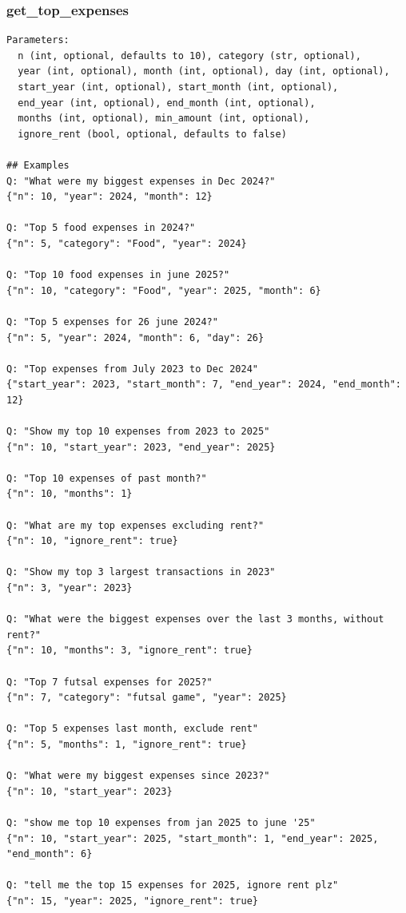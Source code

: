 \documentclass[11pt,twocolumn]{article}
\begin{document}
\subsubsection{get\_top\_expenses}
\begin{scriptsize}
\begin{verbatim}
Parameters:
  n (int, optional, defaults to 10), category (str, optional),
  year (int, optional), month (int, optional), day (int, optional),
  start_year (int, optional), start_month (int, optional),
  end_year (int, optional), end_month (int, optional),
  months (int, optional), min_amount (int, optional),
  ignore_rent (bool, optional, defaults to false)

## Examples
Q: "What were my biggest expenses in Dec 2024?"
{"n": 10, "year": 2024, "month": 12}

Q: "Top 5 food expenses in 2024?"
{"n": 5, "category": "Food", "year": 2024}

Q: "Top 10 food expenses in june 2025?"
{"n": 10, "category": "Food", "year": 2025, "month": 6}

Q: "Top 5 expenses for 26 june 2024?"
{"n": 5, "year": 2024, "month": 6, "day": 26}

Q: "Top expenses from July 2023 to Dec 2024"
{"start_year": 2023, "start_month": 7, "end_year": 2024, "end_month": 12}

Q: "Show my top 10 expenses from 2023 to 2025"
{"n": 10, "start_year": 2023, "end_year": 2025}

Q: "Top 10 expenses of past month?"
{"n": 10, "months": 1}

Q: "What are my top expenses excluding rent?"
{"n": 10, "ignore_rent": true}

Q: "Show my top 3 largest transactions in 2023"
{"n": 3, "year": 2023}

Q: "What were the biggest expenses over the last 3 months, without rent?"
{"n": 10, "months": 3, "ignore_rent": true}

Q: "Top 7 futsal expenses for 2025?"
{"n": 7, "category": "futsal game", "year": 2025}

Q: "Top 5 expenses last month, exclude rent"
{"n": 5, "months": 1, "ignore_rent": true}

Q: "What were my biggest expenses since 2023?"
{"n": 10, "start_year": 2023}

Q: "show me top 10 expenses from jan 2025 to june '25"
{"n": 10, "start_year": 2025, "start_month": 1, "end_year": 2025, "end_month": 6}

Q: "tell me the top 15 expenses for 2025, ignore rent plz"
{"n": 15, "year": 2025, "ignore_rent": true}
\end{verbatim}
\end{scriptsize}
\end{document}
